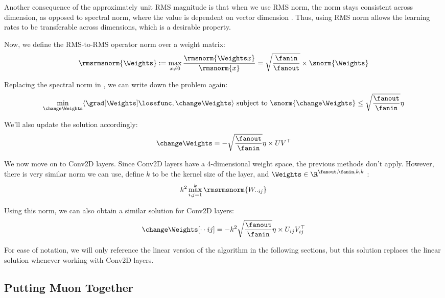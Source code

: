 \documentclass[12pt]{article}
\begin{document}
Another consequence of the approximately unit RMS magnitude is that when we use RMS norm, the norm stays consistent across dimension, as opposed to spectral norm, where the value is dependent on vector dimension \cite{bernstein2025deriving}. Thus, using RMS norm allows the learning rates to be transferable across dimensions, which is a desirable property. 

Now, we define the RMS-to-RMS operator norm over a weight matrix:
\begin{align}
    \rmsrmsnorm{\Weights} := \max_{x \ne 0} \frac{\rmsnorm{\Weights x}}{\rmsnorm{x}} = \sqrt{\frac{\fanin}{\fanout}} \times \snorm{\Weights}
\end{align}

Replacing the spectral norm in , we can write down the problem again:
\begin{align}
    \min_{\change \Weights} \langle \grad[\Weights]\lossfunc, \change \Weights \rangle \text{ subject to } \snorm{\change \Weights} \le \sqrt{\frac{\fanout}{\fanin}} \eta
\end{align}

We'll also update the solution accordingly:
\begin{align}
    \change \Weights = - \sqrt{\frac{\fanout}{\fanin}}\eta \times UV^\top
\end{align}

We now move on to Conv2D layers. Since Conv2D layers have a 4-dimensional weight space, the previous methods don't apply. However, there is very similar norm we can use, define $k$ to be the kernel size of the layer, and $\Weights \in \R^{\fanout, \fanin, k, k}$ \cite{bernstein2024modulardualitydeeplearning}:
\begin{align}
    k^2 \max^k_{i,j = 1} \rmsrmsnorm{W_{\cdot\cdot ij}}
\end{align}

Using this norm, we can also obtain a similar solution for Conv2D layers:
\begin{align}
    \change \Weights[\cdot\cdot ij] = - k^2\sqrt{\frac{\fanout}{\fanin}}\eta \times U_{ij}V_{ij}^\top
\end{align}

For ease of notation, we will only reference the linear version of the algorithm in the following sections, but this solution replaces the linear solution whenever working with Conv2D layers. 

\subsection{Putting Muon Together}
\end{document}
